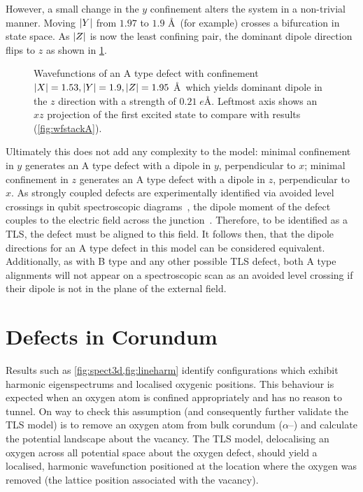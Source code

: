 However, a small change in the $y$ confinement alters the system in a non-trivial manner.
Moving $\lvert Y\rvert$ from $1.97$ to $1.9$ \AA\ (for example) crosses a bifurcation in state space.
As $\lvert Z\rvert$ is now the least confining pair, the dominant dipole direction flips to $z$ as shown in \cref{fig:atypez}.

\begin{figure}[htb]
  \resizebox{\textwidth}{!}{}
  \caption[B Type Defect in \textit{z}]{\label{fig:atypez}Wavefunctions of an A type defect with confinement $\lvert X\rvert = 1.53, \lvert Y\rvert = 1.9, \lvert Z\rvert = 1.95$ \AA\ which yields dominant dipole in the $z$ direction with a strength of $0.21 \; e$\AA. Leftmost axis shows an $xz$ projection of the first excited state to compare with  results (\cref{fig:wfstackA}).}
\end{figure}

Ultimately this does not add any complexity to the model: minimal confinement in $y$ generates an A type defect with a dipole in $y$, perpendicular to $x$; minimal confinement in $z$ generates an A type defect with a dipole in $z$, perpendicular to $x$.
As strongly coupled defects are experimentally identified via avoided level crossings in qubit spectroscopic diagrams~\cite{Lisenfeld2010}, the dipole moment of the defect couples to the electric field across the junction~\cite{Martinis2005}.
Therefore, to be identified as a TLS, the defect must be aligned to this field.
It follows then, that the dipole directions for an A type defect in this model can be considered equivalent.
Additionally, as with B type and any other possible TLS defect, both A type alignments will not appear on a spectroscopic scan as an avoided level crossing if their dipole is not in the plane of the external field.

\section{Defects in Corundum}\label{sec:corundum}

Results such as \cref{fig:spect3d,fig:lineharm} identify configurations which exhibit harmonic eigenspectrums and localised oxygenic positions.
This behaviour is expected when an oxygen atom is confined appropriately and has no reason to tunnel.
On way to check this assumption (and consequently further validate the TLS model) is to remove an oxygen atom from bulk corundum ($\alpha$--) and calculate the potential landscape about the vacancy.
The TLS model, delocalising an oxygen across all potential space about the oxygen defect, should yield a localised, harmonic wavefunction positioned at the location where the oxygen was removed (\ie the lattice position associated with the vacancy).

